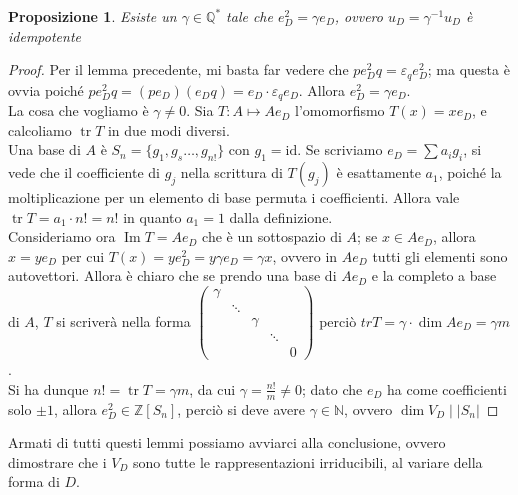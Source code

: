 \documentclass[11pt]{article}
\theoremstyle{plain}
\newtheorem{prop}[thm]{Proposizione}
\theoremstyle{definition}
\theoremstyle{remark}
\newcommand{\Q}{\mathbb{Q}}
\newcommand{\Z}{\mathbb{Z}}
\newcommand{\N}{\mathbb{N}}
\DeclareMathOperator{\tr}{tr}
\DeclareMathOperator{\Imm}{Im}
\begin{document}
\begin{prop}
	Esiste un $\gamma\in\Q^\ast$ tale che $e_D^2=\gamma e_D$, ovvero $u_D=\gamma^{-1}u_D$ è idempotente
\end{prop}
\begin{proof}
	Per il lemma precedente, mi basta far vedere che $pe_D^2q=\varepsilon_q e_D^2$; ma questa è ovvia poiché $pe_D^2q=(pe_D)(e_Dq)=e_D\cdot\varepsilon_q e_D$. Allora $e_D^2=\gamma e_D$.\\
	La cosa che vogliamo è $\gamma\neq0$. Sia $T:A\mapsto Ae_D$ l'omomorfismo $T(x)=xe_D$, e calcoliamo $\tr T$ in due modi diversi.\\
	Una base di $A$ è $S_n=\{g_1,g_s\dots,g_{n!}\}$ con $g_1=\mathrm{id}$. Se scriviamo $e_D=\sum a_i g_i$, si vede che il coefficiente di $g_j$ nella scrittura di $T(g_j)$ è esattamente $a_1$, poiché la moltiplicazione per un elemento di base permuta i coefficienti. Allora vale $\tr T=a_1\cdot n!=n!$ in quanto $a_1=1$ dalla definizione.\\
	Consideriamo ora $\Imm T=Ae_D$ che è un sottospazio di $A$; se $x\in Ae_D$, allora $x=ye_D$ per cui $T(x)=ye_D^2=y\gamma e_D=\gamma x$, ovvero in $Ae_D$ tutti gli elementi sono autovettori. Allora è chiaro che se prendo una base di $Ae_D$ e la completo a base di $A$, $T$ si scriverà nella forma $\left(\begin{array}{ccccc}
	\gamma & & & & \\
	& \ddots & & & \\
	& & \gamma & & \\
	& & & \ddots & \\
	& & & & 0
	\end{array}\right)$ perciò $tr T=\gamma\cdot\dim Ae_D=\gamma m$.\\
	Si ha dunque $n!=\tr T = \gamma m$, da cui $\gamma=\frac{n!}{m}\neq0$; dato che $e_D$ ha come coefficienti solo $\pm1$, allora $e_D^2\in\Z[S_n]$, perciò si deve avere $\gamma\in\N$, ovvero $\dim V_D\mid |S_n|$
\end{proof}

Armati di tutti questi lemmi possiamo avviarci alla conclusione, ovvero dimostrare che i $V_D$ sono tutte le rappresentazioni irriducibili, al variare della forma di $D$.
\end{document}
